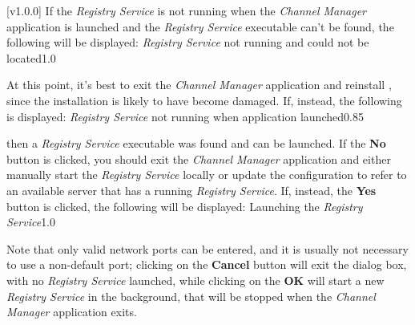 [v1.0.0]
If the \emph{Registry Service} is not running when the \emph{Channel Manager} application
is launched and the \emph{Registry Service} executable can't be found, the following will
be displayed:
%
{\emph{Registry Service} not running and could not be located}{1.0}

At this point, it's best to exit the \emph{Channel Manager} application and reinstall
\mplusm, since the installation is likely to have become damaged.
If, instead, the following is displayed:
%
{\emph{Registry Service} not running when application launched}{0.85}

then a \emph{Registry Service} executable was found and can be launched.
If the \textbf{No} button is clicked, you should exit the \emph{Channel Manager}
application and either manually start the \emph{Registry Service} locally or update the
\yarp{} configuration to refer to an available \yarp{} server that has a running
\emph{Registry Service}.
\condPage{}
If, instead, the \textbf{Yes} button is clicked, the following will be displayed:
%
{Launching the \emph{Registry Service}}{1.0}

Note that only valid network ports can be entered, and it is usually not necessary to use
a non-default port; clicking on the \textbf{Cancel} button will exit the dialog box, with
no \emph{Registry Service} launched, while clicking on the \textbf{OK} will start a new
\emph{Registry Service} in the background, that will be stopped when the
\emph{Channel Manager} application exits.
\appendixEnd{}

